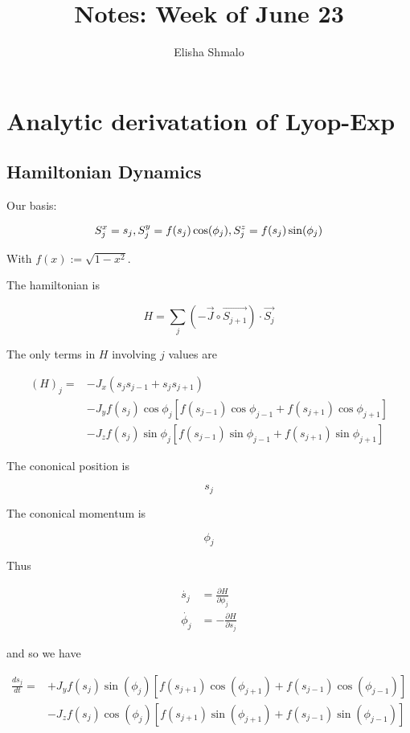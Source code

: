 \documentclass{article}
\author{Elisha Shmalo}
\title{Notes: Week of June 23}
\begin{document}
\maketitle

\section{Analytic derivatation of Lyop-Exp}

\subsection{Hamiltonian Dynamics}

Our basis:

\[
S_j^x = s_j, \space S_j^y = f(s_j)\cos(\phi_j), \space S_j^z = f(s_j)\sin(\phi_j)
\]

With $f(x) := \sqrt{1 - x^2}$.

The hamiltonian is

\[
H = \sum_j (-\vec{J} \circ \vec{S_{j+1}}) \cdot \vec{S_j}
\]

The only terms in $H$ involving $j$ values are

\begin{align*}
    (H)_j = &-J_x(s_js_{j-1} + s_js_{j+1}) \\
            &-J_yf(s_j)\cos\phi_j[f(s_{j-1})\cos\phi_{j-1} + f(s_{j+1})\cos\phi_{j+1}] \\
            &-J_zf(s_j)\sin\phi_j[f(s_{j-1})\sin\phi_{j-1} + f(s_{j+1})\sin\phi_{j+1}]
\end{align*}

The cononical position is

\[s_j\]

The cononical momentum is

\[\phi_j\]

Thus

\begin{align*}
    \dot{s_j} &= \frac{\partial H}{\partial \phi_j}\\
    \dot{\phi_j} &= -\frac{\partial H}{\partial s_j}
\end{align*}

and so we have

\begin{align*}
    \frac{ds_j}{dt} = &+J_yf(s_j)\sin(\phi_j)[f(s_{j+1})\cos(\phi_{j+1}) + f(s_{j-1})\cos(\phi_{j-1})] \\
                      &-J_zf(s_j)\cos(\phi_j)[f(s_{j+1})\sin(\phi_{j+1}) + f(s_{j-1})\sin(\phi_{j-1})]
\end{align*}
\end{document}
